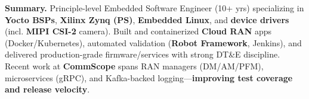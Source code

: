 %
%

\par{
{\textbf{Summary.}} 
Principle-level Embedded Software Engineer (10+ yrs) specializing in \textbf{Yocto BSPs}, \textbf{Xilinx Zynq (PS)}, 
\textbf{Embedded Linux}, and \textbf{device drivers} (incl. \textbf{MIPI CSI-2} camera). Built and containerized \textbf{Cloud RAN} 
apps (Docker/Kubernetes), automated validation (\textbf{Robot Framework}, Jenkins), and delivered 
production-grade firmware/services with strong DT\&E discipline. Recent work at \textbf{CommScope} spans 
RAN managers (DM/AM/PFM), microservices (gRPC), and Kafka-backed logging—\textbf{improving test coverage 
and release velocity}.
}